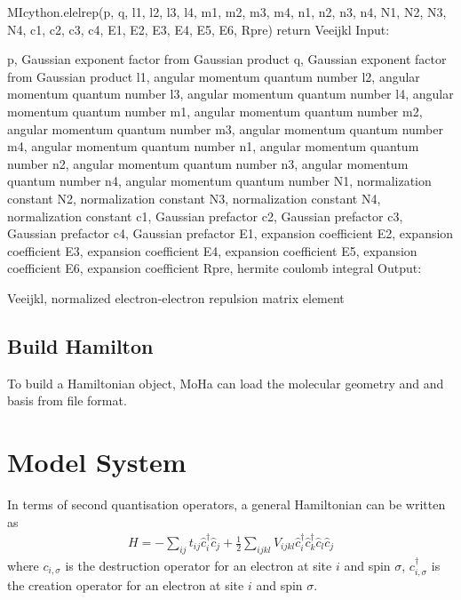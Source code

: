 \documentclass[letterpaper,10pt,english]{sphinxmanual}
\begin{document}
MIcython.elelrep(p, q, l1, l2, l3, l4, m1, m2, m3, m4, n1, n2, n3, n4, N1, N2, N3, N4, c1, c2, c3, c4, E1, E2, E3, E4, E5, E6, Rpre)
return Veeijkl
Input:

p, Gaussian exponent factor from Gaussian product
q, Gaussian exponent factor from Gaussian product
l1, angular momentum quantum number
l2, angular momentum quantum number
l3, angular momentum quantum number
l4, angular momentum quantum number
m1, angular momentum quantum number
m2, angular momentum quantum number
m3, angular momentum quantum number
m4, angular momentum quantum number
n1, angular momentum quantum number
n2, angular momentum quantum number
n3, angular momentum quantum number
n4, angular momentum quantum number
N1, normalization constant
N2, normalization constant
N3, normalization constant
N4, normalization constant
c1, Gaussian prefactor
c2, Gaussian prefactor
c3, Gaussian prefactor
c4, Gaussian prefactor
E1, expansion coefficient
E2, expansion coefficient
E3, expansion coefficient
E4, expansion coefficient
E5, expansion coefficient
E6, expansion coefficient
Rpre, hermite coulomb integral
Output:

Veeijkl, normalized electron-electron repulsion matrix element


\subsection{Build Hamilton}
\label{\detokenize{user_molecular_system:build-hamilton}}
To build a Hamiltonian object, MoHa can load the molecular geometry and and basis from file
format.

%
\begin{sphinxVerbatim}[commandchars=\\\{\}]
  
  
\end{sphinxVerbatim}


\section{Model System}
\label{\detokenize{user_model_system:model-system}}\label{\detokenize{user_model_system::doc}}
In terms of second quantisation operators, a general Hamiltonian can be written as
\begin{equation*}
\begin{split}H = - \sum_{ij} t_{ij}\hat{c}^{\dagger}_{i}\hat{c}_{j} + \frac{1}{2} \sum_{ijkl}
V_{ijkl}\hat{c}^{\dagger}_{i}\hat{c}^{\dagger}_{k}\hat{c}_{l}\hat{c}_{j}\end{split}
\end{equation*}
where \(c_{i, \sigma}\) is the destruction operator for an electron at site \(i\)
and spin \(\sigma\), \(c^{\dagger}_{i, \sigma}\) is the creation operator for an
electron at site \(i\) and spin \(\sigma\).
\end{document}
